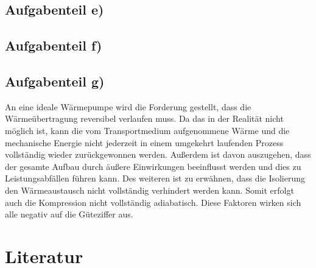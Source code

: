         \subsection{Aufgabenteil e)}


        \subsection{Aufgabenteil f)}


        \subsection{Aufgabenteil g)}

        An eine ideale Wärmepumpe wird die Forderung gestellt, dass die Wärmeübertragung reversibel verlaufen muss.
Da das in der Realität nicht möglich ist, kann die vom Transportmedium aufgenommene Wärme 
und die mechanische Energie nicht jederzeit in einem umgekehrt laufenden Prozess vollständig wieder zurückgewonnen werden.
Außerdem ist davon auszugehen, dass der gesamte Aufbau durch äußere Einwirkungen beeinflusst werden und dies zu Leistungsabfällen führen kann.
Des weiteren ist zu erwähnen, dass die Isolierung den Wärmeaustausch nicht vollständig verhindert werden kann. 
Somit erfolgt auch die Kompression nicht vollständig adiabatisch.
Diese Faktoren wirken sich alle negativ auf die Güteziffer aus.

    \section{Literatur}
